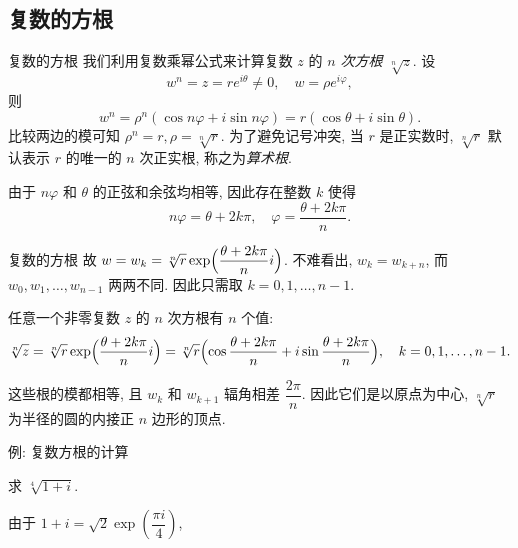 \subsection{复数的方根}
\begin{frame}{复数的方根}
	\onslide<+->
	我们利用复数乘幂公式来计算复数 $z$ 的 \emph{$n$ 次方根 $\sqrt[n]z$}.
	\onslide<+->
	设
	\[w^n=z=re^{i\theta}\neq0,\quad w=\rho e^{i\varphi},\]
	\onslide<+->
	则
	\[w^n=\rho^n(\cos{n\varphi}+i\sin{n\varphi})=r(\cos\theta+i\sin\theta).\]
	\onslide<+->
	比较两边的模可知 $\rho^n=r,\rho=\sqrt[n]r$.
	\onslide<+->
	为了避免记号冲突, 当 $r$ 是正实数时, $\sqrt[n]r$ 默认表示 $r$ 的唯一的 $n$ 次正实根, 称之为\emph{算术根}.

	\onslide<+->
	由于 $n\varphi$ 和 $\theta$ 的正弦和余弦均相等, 因此存在整数 $k$ 使得
	\[n\varphi=\theta+2k\pi,\quad \varphi=\frac{\theta+2k\pi}n.\]
\end{frame}


\begin{frame}{复数的方根}
	\onslide<+->
	故 $w=w_k=\sqrt[n]r\exp\Bigl(\dfrac{\theta+2k\pi}ni\Bigr)$.
	\onslide<+->
	不难看出, $w_k=w_{k+n}$, 而 $w_0,w_1,\dots,w_{n-1}$ 两两不同.
	因此只需取 $k=0,1,\dots,n-1$.
	\onslide<+->
	\begin{theorem}[复数的方根]
		任意一个非零复数 $z$ 的 $n$ 次方根有 $n$ 个值:
		\[
			\sqrt[n]z=\sqrt[n]r\exp\Bigl(\dfrac{\theta+2k\pi}ni\Bigr)\\
				=\sqrt[n]r\Bigl(\cos\frac{\theta+2k\pi}n+i\sin\frac{\theta+2k\pi}n\Bigr),\quad k=0,1,\dots,n-1.
		\]
	\end{theorem}
	\onslide<+->
	这些根的模都相等, 且 $w_k$ 和 $w_{k+1}$ 辐角相差 $\dfrac{2\pi}n$.
	\onslide<+->
	因此\alert{它们是以原点为中心, $\sqrt[n]r$ 为半径的圆的内接正 $n$ 边形的顶点}.
\end{frame}


\begin{frame}{例: 复数方根的计算}
	\onslide<+->
	\begin{example}
		求 $\sqrt[4]{1+i}$.
	\end{example}

	\onslide<+->
	\begin{solution}
		由于 $1+i=\sqrt2\exp\left(\dfrac{\pi i}4\right)$,
		\onslide<+->{%
			于是该方根所有值为
			\[w_0=\sqrt[8]2e^{\frac{\pi i}{16}},\quad
			w_1=\sqrt[8]2e^{\frac{9\pi i}{16}},\quad
			w_2=\sqrt[8]2e^{\frac{17\pi i}{16}},\quad
			w_3=\sqrt[8]2e^{\frac{25\pi i}{16}}.\]
		}
		\vspace{-\baselineskip}
	\end{solution}
\end{frame}


